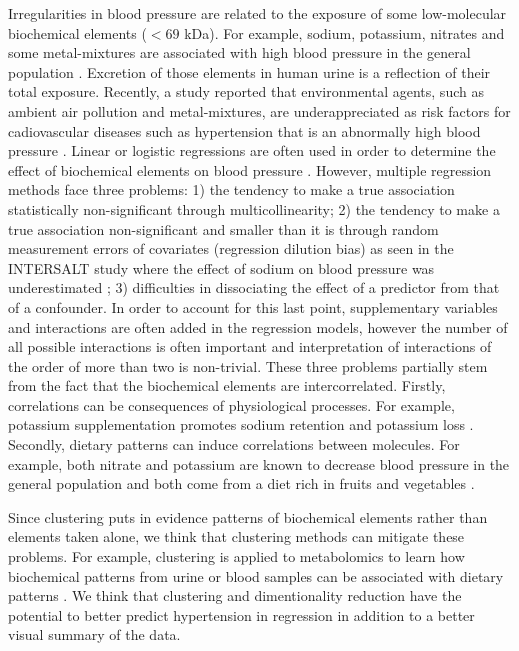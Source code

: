 
Irregularities in blood pressure are related to the exposure of some low-molecular biochemical elements ($<69$ kDa). For example, sodium, potassium, nitrates and some metal-mixtures are associated with high blood pressure in the general population \cite{yang_sodium_2011,mente_association_2014,elliott_intersalt_1996,smallwood_relationship_2017,siervo_inorganic_2013,
bondonno_absence_2015,carlstrom_dietary_2011,abhyankar_arsenic_2011}. Excretion of those elements in human urine is a reflection of their total exposure. Recently, a study reported that environmental agents, such as ambient air pollution and metal-mixtures, are underappreciated as risk factors for cadiovascular diseases such as hypertension that is an abnormally high blood pressure \cite{cosselman_environmental_2015}. Linear or logistic regressions are often used in order to determine the effect of biochemical elements on blood pressure \cite{yang_sodium_2011,mente_association_2014,elliott_intersalt_1996,smallwood_relationship_2017,jones_urine_2011}. However, multiple regression methods face three problems: 1) the tendency to make a true association statistically non-significant through multicollinearity; 2) the tendency to make a true association non-significant and smaller than it is through random measurement errors of covariates (regression dilution bias) as seen in the INTERSALT study where the effect of sodium on blood pressure was underestimated \cite{hutcheon_random_2010}; 3) difficulties in dissociating the effect of a predictor from that of a confounder. In order to account for this last point, supplementary variables and interactions are often added in the regression models, however the number of all possible interactions is often important and interpretation of interactions of the order of more than two is non-trivial. These three problems partially stem from the fact that the biochemical elements are intercorrelated. Firstly, correlations can be consequences of physiological processes. For example, potassium supplementation promotes sodium retention and potassium loss \cite{adrogue_sodium_2014}. Secondly, dietary patterns can induce correlations between molecules. For example, both nitrate and potassium are known to decrease blood pressure in the general population and both come from a diet rich in fruits and vegetables \cite{smallwood_relationship_2017}.

Since clustering puts in evidence patterns of biochemical elements rather than elements taken alone, we think that clustering methods can mitigate these problems. For example, clustering is applied to metabolomics to learn how biochemical patterns from urine or blood samples can be associated with dietary patterns \cite{osullivan_dietary_2011}. We think that clustering and dimentionality reduction have the potential to better predict hypertension in regression in addition to a better visual summary of the data.

